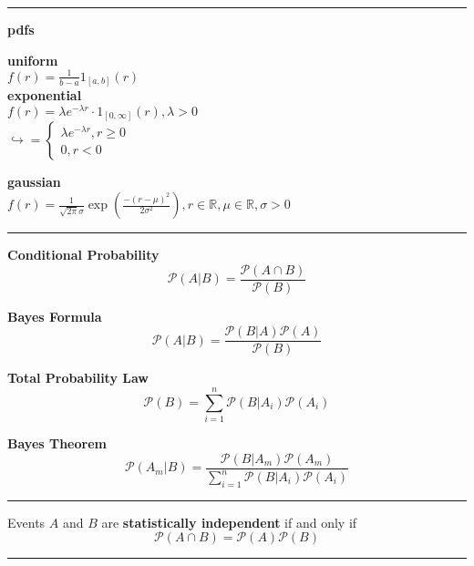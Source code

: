 \documentclass{article}
\renewcommand{\P}{\mathcal{P}}
\providecommand{\R}{\mathbb{R}}
\begin{document}
\begin{multicols*}{3}
        \noindent\rule{\columnwidth}{0.4pt}

        \textbf{pdfs}

        \textbf{uniform}\\
        $f(r)=\frac{1}{b-a}1_{[a,b]}(r)$\\

        \textbf{exponential}\\
        $f(r)=\lambda e^{-\lambda r}\cdot 1_{[0,\infty]}(r),\lambda>0$\\
        $\hookrightarrow =
        \begin{cases}
            \lambda e^{-\lambda r},r\geq 0\\
            0,r<0
        \end{cases}$

        \textbf{gaussian}\\
        $f(r)=\frac{1}{\sqrt{2\pi}\sigma}\exp\left(\frac{-(r-\mu)^2}{2\sigma^2}\right), r\in\R,\mu\in\R,\sigma>0$

        \noindent\rule{\columnwidth}{0.4pt}

        \textbf{Conditional Probability}
        \begin{equation*}
            \P(A|B)=\frac{\P(A\cap B)}{\P(B)}
        \end{equation*}

        \textbf{Bayes Formula}
        \begin{equation*}
            \P(A|B)=\frac{\P(B|A)\P(A)}{\P(B)}
        \end{equation*}

        \textbf{Total Probability Law}
        \begin{equation*}
            \P(B)=\sum_{i=1}^{n}\P(B|A_i)\P(A_i)
        \end{equation*}

        \textbf{Bayes Theorem}
        \begin{equation*}
            \P(A_m|B)=\frac{\P(B|A_m)\P(A_m)}{\sum_{i=1}^{n}\P(B|A_i)\P(A_i)}
        \end{equation*}

        \noindent\rule{\columnwidth}{0.4pt}

        Events $A$ and $B$ are \textbf{statistically independent} if and only if
        \begin{equation*}
            \P(A\cap B) = \P(A)\P(B)
        \end{equation*}

        \noindent\rule{\columnwidth}{0.4pt}


\end{multicols*}
\end{document}
